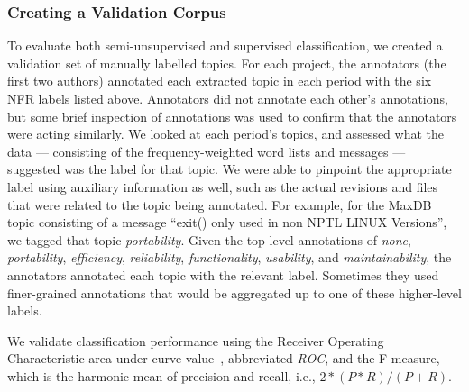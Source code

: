 \documentclass[smallextended]{svjour3}       %
\begin{document}

\subsubsection{Creating a Validation Corpus}
To evaluate both semi-unsupervised and supervised classification, we
created a validation set of manually labelled topics. For each project,
 the annotators (the first two authors) annotated each extracted topic in each period with
the six NFR labels listed above.
Annotators did not annotate each other's annotations, but some brief
inspection of annotations was used to confirm that the annotators were
acting similarly.
We looked at each period's topics, and assessed what the data ---
consisting of the frequency-weighted word lists and messages ---
suggested was the label for that topic. 
We were able to pinpoint the appropriate label using auxiliary information as well, such as the actual revisions and files that were related to the
topic being annotated.
For example, for the MaxDB topic consisting of a message ``exit() only
used in non NPTL LINUX Versions'', we tagged that topic
\emph{portability}. 
Given the top-level annotations of \emph{none}, \emph{portability},
\emph{efficiency}, \emph{reliability}, \emph{functionality},
\emph{usability}, and \emph{maintainability}, the annotators annotated each topic
with the relevant label. Sometimes they used finer-grained
annotations that would be aggregated up to one of these higher-level labels.

We validate classification performance using the Receiver Operating
Characteristic area-under-curve value~\cite{Fawcett2006861},
abbreviated \emph{ROC}, and the F-measure, which is the harmonic mean of precision and recall, i.e., $2 * (P * R) / (P + R)$. 
\end{document}
